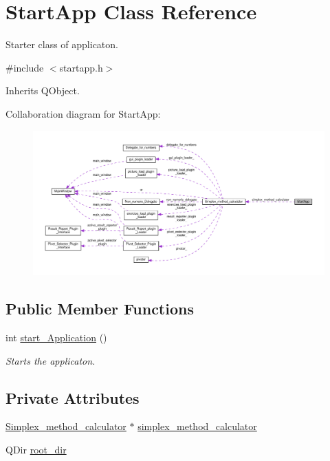 \hypertarget{classStartApp}{}\section{Start\+App Class Reference}
\label{classStartApp}


Starter class of applicaton.  




{\ttfamily \#include $<$startapp.\+h$>$}



Inherits Q\+Object.



Collaboration diagram for Start\+App\+:\nopagebreak
\begin{figure}[H]
\begin{center}
\leavevmode
\includegraphics[width=350pt]{classStartApp__coll__graph}
\end{center}
\end{figure}
\subsection*{Public Member Functions}
\begin{DoxyCompactItemize}
\item 
int \hyperlink{classStartApp_ac70f07e04b8f7766858ce67d75c3b636}{start\+\_\+\+Application} ()
\begin{DoxyCompactList}\small\item\em Starts the applicaton. \end{DoxyCompactList}\end{DoxyCompactItemize}
\subsection*{Private Attributes}
\begin{DoxyCompactItemize}
\item 
\hyperlink{classSimplex__method__calculator}{Simplex\+\_\+method\+\_\+calculator} $\ast$ \hyperlink{classStartApp_aa3f067219fde69ecd40738af7b179780}{simplex\+\_\+method\+\_\+calculator}
\item 
Q\+Dir \hyperlink{classStartApp_aec43484cd57a1722eb328aef4f86f719}{root\+\_\+dir}
\end{DoxyCompactItemize}


